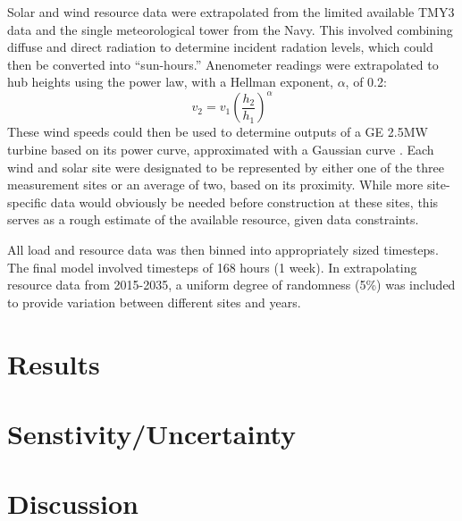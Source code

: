 \documentclass[12pt,letterpaper,fleqn]{report}
\begin{document}
Solar and wind resource data were extrapolated from the limited
available TMY3 data and the single meteorological tower from the
Navy. This involved combining diffuse and direct radiation to
determine incident radation levels, which could then be converted into
``sun-hours.'' Anenometer readings were extrapolated to hub heights
using the power law, with a Hellman exponent, $\alpha$, of 0.2:
\[v_2 = v_1\left(\frac{h_2}{h_1}\right)^\alpha\] 
These wind speeds could then be used to determine outputs of a GE
2.5MW turbine based on its power curve, approximated with a Gaussian
curve \cite{ge}. Each wind and solar site were designated to be
represented by either one of the three measurement sites or an average
of two, based on its proximity. While more site-specific data would
obviously be needed before construction at these sites, this serves as
a rough estimate of the available resource, given data constraints.

All load and resource data was then binned into appropriately sized
timesteps. The final model involved timesteps of 168 hours (1
week). In extrapolating resource data from 2015-2035, a uniform
degree of randomness (5\%) was included to provide variation between
different sites and years. 

\section{Results}

\section{Senstivity/Uncertainty}

\section{Discussion}
\end{document}
